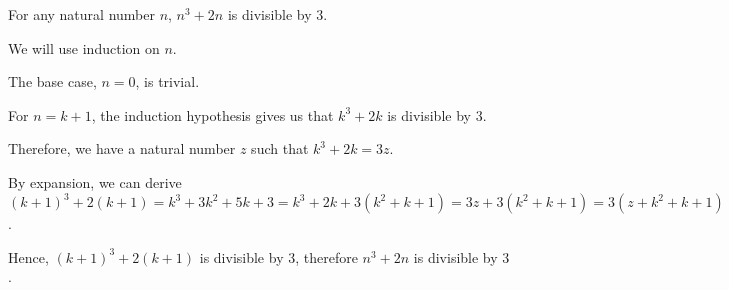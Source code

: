 For any natural number $n$, $n^3 + 2n$ is divisible by $3$.

We will use induction on $n$.

The base case, $n = 0$, is trivial.

For $n = k+1$, the induction hypothesis gives us that $k^3 + 2k$ is divisible by $3$.

Therefore, we have a natural number $z$ such that $k^3 + 2k = 3z$.

By expansion, we can derive $(k+1)^3 + 2(k+1) = k^3 + 3k^2 + 5k + 3 = k^3 + 2k + 3(k^2 + k + 1) =3z + 3(k^2 + k + 1) = 3(z+k^2+k+1)$.

Hence, $(k+1)^3 + 2(k+1)$ is divisible by $3$, therefore $n^3 + 2n$ is divisible by $3$.
